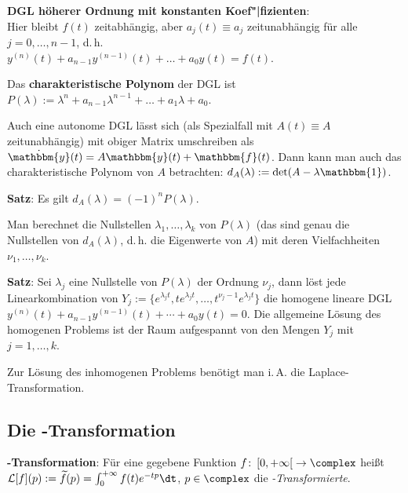 \linie

\textbf{DGL höherer Ordnung mit konstanten Koef"|fizienten}: \\
Hier bleibt $f(t)$ zeitabhängig, aber $a_j(t) \equiv a_j$ zeitunabhängig
für alle $j = 0, \dotsc, n - 1$, d.\,h. \\
$y^{(n)}(t) + a_{n-1} y^{(n-1)}(t) + \dotsc + a_0 y(t) = f(t)$.

Das \textbf{charakteristische Polynom} der DGL ist
$P(\lambda) := \lambda^n + a_{n-1} \lambda^{n-1} + \dotsc + a_1 \lambda + a_0$.

Auch eine autonome DGL lässt sich (als Spezialfall mit $A(t) \equiv A$
zeitunabhängig) mit obiger Matrix umschreiben als
$\dot{\mathbbm{y}}(t) = A \mathbbm{y}(t) + \mathbbm{f}(t)$.
Dann kann man auch das charakteristische Polynom von $A$ betrachten:
$d_A(\lambda) := \det(A - \lambda \mathbbm{1})$.

\textbf{Satz}:
Es gilt $d_A(\lambda) = (-1)^n P(\lambda)$.

Man berechnet die Nullstellen $\lambda_1, \dotsc, \lambda_k$
von $P(\lambda)$ (das sind genau die Nullstellen
von $d_A(\lambda)$, d.\,h. die Eigenwerte von $A$)
mit deren Vielfachheiten $\nu_1, \dotsc, \nu_k$.

\textbf{Satz}:
Sei $\lambda_j$ eine Nullstelle von $P(\lambda)$ der Ordnung $\nu_j$,
dann löst jede Linearkombination von
$Y_j := \{e^{\lambda_j t}, t e^{\lambda_j t}, \dotsc,
t^{\nu_j - 1} e^{\lambda_j t}\}$ die homogene lineare DGL \\
$y^{(n)}(t) + a_{n-1} y^{(n-1)}(t) + \dotsb + a_0 y(t) = 0$.
Die allgemeine Lösung des homogenen Problems ist der Raum aufgespannt von
den Mengen $Y_j$ mit $j = 1, \dotsc, k$.

Zur Lösung des inhomogenen Problems benötigt man i.\,A.
die Laplace-Transformation.

\pagebreak

\subsection{%
    Die -Transformation%
}

\textbf{-Transformation}:
Für eine gegebene Funktion
$f\colon \left[0, +\infty\right[ \rightarrow \complex$ heißt \\
$\L[f](p) := \widetilde{f}(p) = \int_0^{+\infty} f(t) e^{-tp} \dt$,
$p \in \complex$ die \emph{-Transformierte}.

